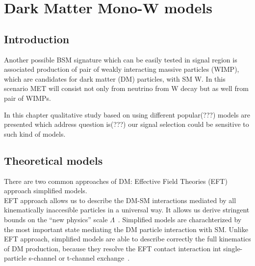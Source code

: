 \chapter{Dark Matter Mono-W models}
\label{chap:monoW}


\section{Introduction}

Another possible BSM signature which can be easily tested in signal region is
associated production of pair of weakly interacting massive particles (WIMP), 
which are candidates for dark matter (DM) particles, with SM W. 
In this scenario MET will consist not only from neutrino from W decay but as 
well from pair of WIMPs.

In this chapter qualitative study based on using different popular(???) models are presented 
which address question is(???) our signal selection could be sensitive to such 
kind of models.



\section{Theoretical models}

There are two common approaches of DM: Effective Field Theories (EFT) approach simplified models. \\
EFT approach allows us to describe the DM-SM interactions mediated by all kinematically inaccesible particles in a universal way. 
It allows us derive stringent bounds on the ``new physics'' scale $\Lambda$~\cite{arXiv:1506.03116}. 
Simplified models are charachterized by the most important state mediating the DM particle interaction with SM. Unlike EFT approach,
simplified models are able to describe correctly the full kinematics of DM production, because they resolve the EFT contact interaction int single-particle 
s-channel or t-channel exchange~\cite{arXiv:1506.03116}. 



